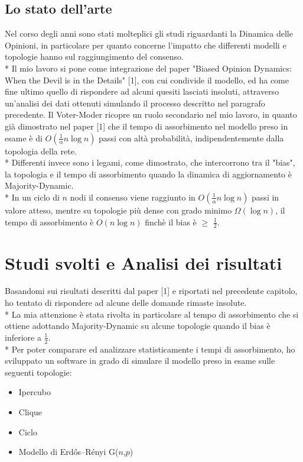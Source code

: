 \documentclass{article}
\begin{document}
\subsection{Lo stato dell'arte}
Nel corso degli anni sono stati molteplici gli studi riguardanti la Dinamica delle Opinioni, in particolare per quanto concerne l'impatto che differenti modelli e topologie hanno sul raggiungimento del consenso.\\*
Il mio lavoro si pone come integrazione del paper "Biased Opinion Dynamics: When the Devil is in the Details" [1], con cui condivide il modello, ed ha come fine ultimo quello di rispondere ad alcuni quesiti lasciati insoluti, attraverso un'analisi dei dati ottenuti simulando il processo descritto nel paragrafo precedente.
Il Voter-Moder ricopre un ruolo secondario nel mio lavoro, in quanto già dimostrato nel paper [1] che il tempo di assorbimento nel modello preso in esame è di $O(\frac{1}{\alpha}n\log{}n)$ passi con altà probabilità, indipendentemente dalla topologia della rete.\\*
Differenti invece sono i legami, come dimostrato, che intercorrono tra il "bias", la topologia e il tempo di assorbimento quando la dinamica di aggiornamento è Majority-Dynamic.\\*
In un ciclo di $n$ nodi il consenso viene raggiunto in $O(\frac{1}{\alpha}n\log{}n)$ passi in valore atteso, mentre su topologie più dense con grado minimo $\Omega(\log{}n)$, il tempo di assorbimento è $O(n\log{}n)$ finchè il bias è $\geq$ $\frac{1}{2}$.


\section{Studi svolti e Analisi dei risultati}
Basandomi sui risultati descritti dal paper [1] e riportati nel precedente capitolo, ho tentato di rispondere ad alcune delle domande rimaste insolute.\\*
La mia attenzione è stata rivolta in particolare al tempo di assorbimento che si ottiene adottando Majority-Dynamic su alcune topologie quando il bias è inferiore a $\frac{1}{2}$.\\*
Per poter comparare ed analizzare statisticamente i tempi di assorbimento, ho sviluppato un software in grado di simulare il modello preso in esame sulle seguenti topologie:
 \begin{itemize}
\item Ipercubo
\item Clique
\item Ciclo
\item Modello di Erdős–Rényi G($n$,$p$)
\end{itemize}
\end{document}
